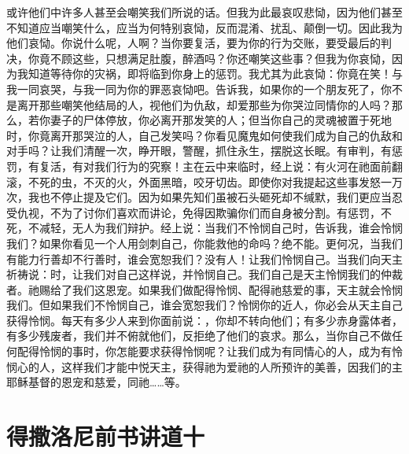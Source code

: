 或许他们中许多人甚至会嘲笑我们所说的话。但我为此最哀叹悲恸，因为他们甚至不知道应当嘲笑什么，应当为何特别哀恸，反而混淆、扰乱、颠倒一切。因此我为他们哀恸。你说什么呢，人啊？当你要复活，要为你的行为交账，要受最后的判决，你竟不顾这些，只想满足肚腹，醉酒吗？你还嘲笑这些事？但我为你哀恸，因为我知道等待你的灾祸，即将临到你身上的惩罚。我尤其为此哀恸：你竟在笑！与我一同哀哭，与我一同为你的罪恶哀恸吧。告诉我，如果你的一个朋友死了，你不是离开那些嘲笑他结局的人，视他们为仇敌，却爱那些为你哭泣同情你的人吗？那么，若你妻子的尸体停放，你必离开那发笑的人；但当你自己的灵魂被置于死地时，你竟离开那哭泣的人，自己发笑吗？你看见魔鬼如何使我们成为自己的仇敌和对手吗？让我们清醒一次，睁开眼，警醒，抓住永生，摆脱这长眠。有审判，有惩罚，有复活，有对我们行为的究察！主在云中来临时，经上说：有火河在祂面前翻滚，不死的虫，不灭的火，外面黑暗，咬牙切齿。即使你对我提起这些事发怒一万次，我也不停止提及它们。因为如果先知们虽被石头砸死却不缄默，我们更应当忍受仇视，不为了讨你们喜欢而讲论，免得因欺骗你们而自身被分割。有惩罚，不死，不减轻，无人为我们辩护。经上说：当我们不怜悯自己时，告诉我，谁会怜悯我们？如果你看见一个人用剑刺自己，你能救他的命吗？绝不能。更何况，当我们有能力行善却不行善时，谁会宽恕我们？没有人！让我们怜悯自己。当我们向天主祈祷说：时，让我们对自己这样说，并怜悯自己。我们自己是天主怜悯我们的仲裁者。祂赐给了我们这恩宠。如果我们做配得怜悯、配得祂慈爱的事，天主就会怜悯我们。但如果我们不怜悯自己，谁会宽恕我们？怜悯你的近人，你必会从天主自己获得怜悯。每天有多少人来到你面前说：，你却不转向他们；有多少赤身露体者，有多少残废者，我们并不俯就他们，反拒绝了他们的哀求。那么，当你自己不做任何配得怜悯的事时，你怎能要求获得怜悯呢？让我们成为有同情心的人，成为有怜悯心的人，这样我们才能中悦天主，获得祂为爱祂的人所预许的美善，因我们的主耶稣基督的恩宠和慈爱，同祂……等。\par



\section{得撒洛尼前书讲道十}


